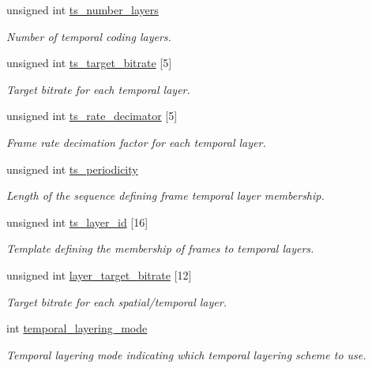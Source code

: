\begin{DoxyCompactItemize}
unsigned int \hyperlink{structvpx__codec__enc__cfg_a16d4549a30cbd585e3c3056ef873d8c7}{ts\+\_\+number\+\_\+layers}
\begin{DoxyCompactList}\small\item\em Number of temporal coding layers. \end{DoxyCompactList}\item 
unsigned int \hyperlink{structvpx__codec__enc__cfg_aba7ceb7a90500a8f76aff89575737f3a}{ts\+\_\+target\+\_\+bitrate} \mbox{[}5\mbox{]}
\begin{DoxyCompactList}\small\item\em Target bitrate for each temporal layer. \end{DoxyCompactList}\item 
unsigned int \hyperlink{structvpx__codec__enc__cfg_ad40c30846ef8ef1d8684f10a491ec535}{ts\+\_\+rate\+\_\+decimator} \mbox{[}5\mbox{]}
\begin{DoxyCompactList}\small\item\em Frame rate decimation factor for each temporal layer. \end{DoxyCompactList}\item 
unsigned int \hyperlink{structvpx__codec__enc__cfg_a4ec338780115dd270acf0dac24193474}{ts\+\_\+periodicity}
\begin{DoxyCompactList}\small\item\em Length of the sequence defining frame temporal layer membership. \end{DoxyCompactList}\item 
unsigned int \hyperlink{structvpx__codec__enc__cfg_a4d105d2470dbfb7210b33d298f1cf1f6}{ts\+\_\+layer\+\_\+id} \mbox{[}16\mbox{]}
\begin{DoxyCompactList}\small\item\em Template defining the membership of frames to temporal layers. \end{DoxyCompactList}\item 
unsigned int \hyperlink{structvpx__codec__enc__cfg_a3f6b4c8aea7a713c51ad5d44e3552b1f}{layer\+\_\+target\+\_\+bitrate} \mbox{[}12\mbox{]}
\begin{DoxyCompactList}\small\item\em Target bitrate for each spatial/temporal layer. \end{DoxyCompactList}\item 
int \hyperlink{structvpx__codec__enc__cfg_a07c78dd29423d5ab475b9d77a0107d16}{temporal\+\_\+layering\+\_\+mode}
\begin{DoxyCompactList}\small\item\em Temporal layering mode indicating which temporal layering scheme to use. \end{DoxyCompactList}\end{DoxyCompactItemize}



